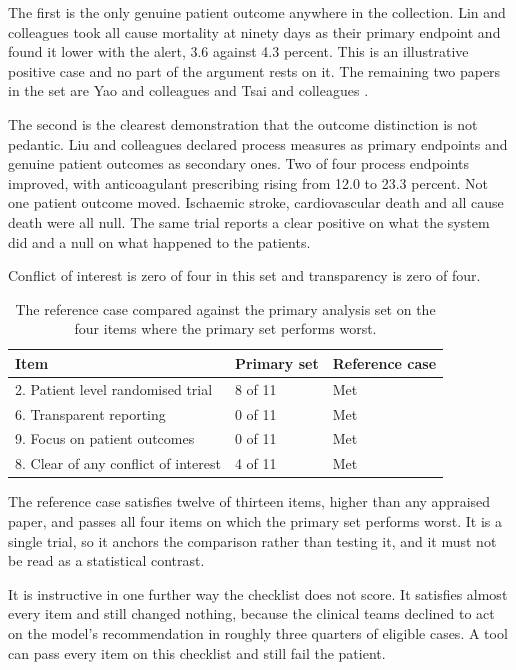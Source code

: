 \documentclass{article}
\begin{document}
The first is the only genuine patient outcome anywhere in the collection. Lin and colleagues
\cite{lin2024} took all cause mortality at ninety days as their primary endpoint and found it lower
with the alert, 3.6 against 4.3 percent. This is an illustrative positive case and no part of the
argument rests on it. The remaining two papers in the set are Yao and colleagues \cite{yao2021} and
Tsai and colleagues \cite{tsai2025}.

The second is the clearest demonstration that the outcome distinction is not pedantic. Liu and
colleagues \cite{liu2025} declared process measures as primary endpoints and genuine patient
outcomes as secondary ones. Two of four process endpoints improved, with anticoagulant prescribing
rising from 12.0 to 23.3 percent.
Not one patient outcome moved. Ischaemic stroke, cardiovascular death and all cause death were all
null. The same trial reports a clear positive on what the system did and a null on what happened to
the patients.

Conflict of interest is zero of four in this set and transparency is zero of four.

\begin{table}[h]
  \caption{The reference case compared against the primary analysis set on the four items where the
  primary set performs worst.}
  \label{tab:refcase}
  \centering
  \small
  \begin{tabular}{lll}
    \toprule
    Item & Primary set & Reference case \\
    \midrule
    2. Patient level randomised trial   & 8 of 11 & Met \\
    6. Transparent reporting            & 0 of 11 & Met \\
    9. Focus on patient outcomes        & 0 of 11 & Met \\
    8. Clear of any conflict of interest & 4 of 11 & Met \\
    \bottomrule
  \end{tabular}
\end{table}

The reference case satisfies twelve of thirteen items, higher than any appraised paper, and passes
all four items on which the primary set performs worst. It is a single trial, so it anchors the
comparison rather than testing it, and it must not be read as a statistical contrast.

It is instructive in one further way the checklist does not score. It satisfies almost every item
and still changed nothing, because the clinical teams declined to act on the model's recommendation
in roughly three quarters of eligible cases. A tool can pass every item on this checklist and still
fail the patient.
\end{document}
